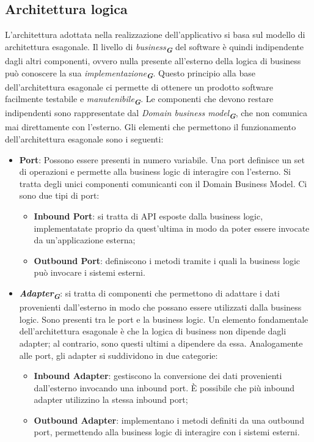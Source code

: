 \subsection{Architettura logica}
L’architettura adottata nella realizzazione dell’applicativo si basa sul modello di architettura esagonale. Il livello di \emph{business}\textsubscript{\textbf{\textit{G}}} del software è quindi indipendente dagli altri componenti, ovvero nulla presente all’esterno della logica di business può conoscere la sua \emph{implementazione}\textsubscript{\textbf{\textit{G}}}. Questo principio alla base dell’architettura esagonale ci permette di ottenere un prodotto software facilmente testabile e \emph{manutenibile}\textsubscript{\textbf{\textit{G}}}. Le componenti che devono restare indipendenti sono rappresentate dal \emph{Domain business model}\textsubscript{\textbf{\textit{G}}}, che non comunica mai direttamente con l’esterno.
Gli elementi che permettono il funzionamento dell’architettura esagonale sono i seguenti:
\begin{itemize}
    \item \textbf{Port}: Possono essere presenti in numero variabile. Una port definisce un set di operazioni e permette alla business logic di interagire con l’esterno. Si tratta degli unici componenti comunicanti con il Domain Business Model. Ci sono due tipi di port:
    \begin{itemize}
        \item \textbf{Inbound Port}: si tratta di API esposte dalla business logic, implementatate proprio da quest’ultima in modo da poter essere invocate da un’applicazione esterna;
        \item \textbf{Outbound Port}: definiscono i metodi tramite i quali la business logic può invocare i sistemi esterni. 
    \end{itemize}
    \item \textbf{\emph{Adapter}\textsubscript{\textbf{\textit{G}}}}: si tratta di componenti che permettono di adattare i dati provenienti dall’esterno in modo che possano essere utilizzati dalla business logic. Sono presenti tra le port e la business logic. Un elemento fondamentale dell'architettura esagonale è che la logica di business non dipende dagli adapter; al contrario, sono questi ultimi a dipendere da essa. Analogamente alle port, gli adapter si suddividono in due categorie:
    \begin{itemize}
        \item \textbf{Inbound Adapter}: gestiscono la conversione dei dati provenienti dall'esterno invocando una inbound port. È possibile che più inbound adapter utilizzino la stessa inbound port;
        \item \textbf{Outbound Adapter}: implementano i metodi definiti da una outbound port, permettendo alla business logic di interagire con i sistemi esterni.
    \end{itemize}
\end{itemize}

